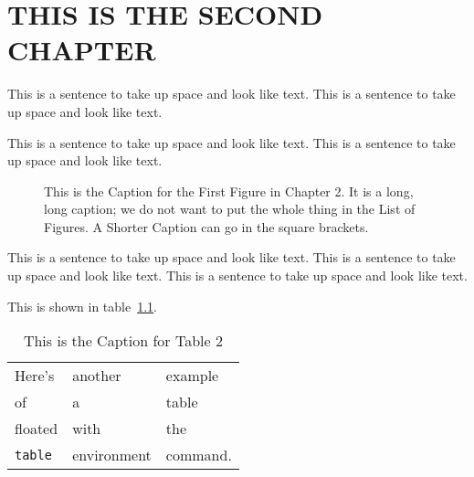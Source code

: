 
\chapter{THIS IS THE SECOND CHAPTER}
This is a sentence to take up space and look like text.
This is a sentence to take up space and look like text.

This is a sentence to take up space and look like text.
This is a sentence to take up space and look like text.

\begin{figure}
\centering
\vspace{2.0in}
\caption[A Shorter Caption for the List of Figures]
   {This is the Caption for the First Figure in Chapter 2.  It is a
    long, long caption; we do not want to put the whole thing in the
    List of Figures. A Shorter Caption can go in the square brackets.}
\end{figure}

This is a sentence to take up space and look like text.
This is a sentence to take up space and look like text.
This is a sentence to take up space and look like text.

This is shown in table~\ref{mytable}.  %

\begin{table}
\caption{This is the Caption for Table 2}
\label{mytable}        %
\begin{center}
\begin{tabular}{lll}
Here's       & another     & example  \\
of           & a           & table    \\
floated      & with        & the      \\
\verb+table+ & environment & command.
\end{tabular}
\end{center}
\end{table}

